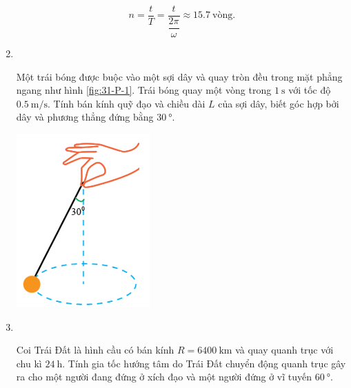 \begin{enumerate}[label=\bfseries Câu \arabic*:, leftmargin=1.5cm]
{		$$n = \dfrac{t}{T} = \dfrac{t}{\dfrac{2\pi}{\omega}}\approx\SI{15.7}{\text{vòng}}.$$
		
	}

\item {}\\
{Một trái bóng được buộc vào một sợi dây và quay tròn đều trong mặt phẳng ngang như hình \ref{fig:31-P-1}. Trái bóng quay một vòng trong $\SI{1}{\second}$ với tốc độ $\SI{0.5}{\meter/\second}$. Tính bán kính quỹ đạo và chiều dài $L$ của sợi dây, biết góc hợp bởi dây và phương thẳng đứng bằng $\SI{30}{\degree}$.
\begin{center}
	\includegraphics[width=0.2\linewidth]{../figs/VN10-2023-PH-TP031-P-1}
	\label{fig:31-P-1}
\end{center}
}

\item {}\\
{Coi Trái Đất là hình cầu có bán kính $R=\SI{6400}{\kilo\meter}$ và quay quanh trục với chu kì $\SI{24}{\hour}$. Tính gia tốc hướng tâm do Trái Đất chuyển động quanh trục gây ra cho một người đang đứng ở xích đạo và một người đứng ở vĩ tuyến $\SI{60}{\degree}$.

}
\end{enumerate}